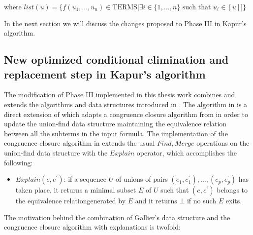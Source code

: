 where $list(u) = \{ f(u_1, \dots, u_n) \in \text{TERMS} 
| \exists i \in \{1, \dots, n\} \text{ such that } u_i \in [u] ] \}$

In the next section we will discuss the changes proposed to 
Phase III in Kapur's algorithm. 

\subsection{New optimized conditional elimination 
and replacement step in Kapur's algorithm}

The modification of Phase III implemented in this thesis work
combines and extends the algorithms and data structures introduced
in \cite{GALLIER1987233, 10.1007/978-3-540-32033-3_33}.
The algorithm in \cite{GALLIER1987233} is a direct
extension of \cite{DOWLING1984267} which adapts a 
congruence closure algorithm from 
\cite{10.1145/322186.322198, 10.1145/322217.322228} in order
to update the union-find data structure maintaining the
equivalence relation between all the subterms in the input
formula. The implementation of the congruence closure
algorithm in \cite{10.1007/978-3-540-32033-3_33}
extends the usual $Find, Merge$ operations on the 
union-find data structure with the $Explain$ operator, 
which accomplishes the following:

\begin{itemize} \label{explain_def}
  \item[] $Explain(e, e^{'})$: if a sequence $U$ of
    unions of pairs $(e_1, e_1^{'}), \dots, (e_p, e_p^{'})$
    has taken place, it returns a minimal subset $E$
    of $U$ such that $(e, e^{'})$ belongs to the equivalence
    relationgenerated by $E$ and it returns $\bot$
    if no such $E$ exits.
\end{itemize}

The motivation behind the combination of 
Gallier's data structure and the congruence 
closure algorithm with explanations is twofold: 

